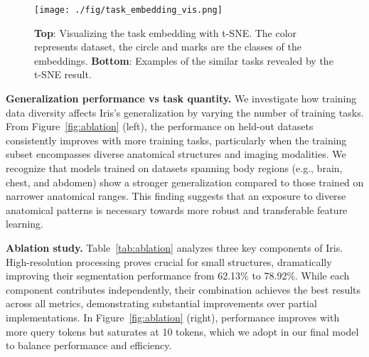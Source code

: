 \begin{figure}[t]
\begin{center}
\texttt{[image: ./fig/task\_embedding\_vis.png]}
\end{center}
\vspace{-1em}
\caption{\textbf{Top}: Visualizing the task embedding with t-SNE. The color represents dataset, the circle and marks are the classes of the embeddings. \textbf{Bottom}: Examples of the similar tasks revealed by the t-SNE result. }
\label{fig:task_embedding_vis}
\vspace{-1em}
\end{figure}


\noindent\textbf{Generalization performance vs task quantity.}
We investigate how training data diversity affects Iris's generalization by varying the number of training tasks. From Figure~\ref{fig:ablation} (left), the performance on held-out datasets consistently improves with more training tasks, particularly when the training subset encompasses diverse anatomical structures and imaging modalities. We recognize that models trained on datasets spanning body regions (e.g., brain, chest, and abdomen) show a stronger generalization compared to those trained on narrower anatomical ranges. This finding suggests that an exposure to diverse anatomical patterns is necessary towards more robust and transferable feature learning.



\noindent\textbf{Ablation study.}
Table~\ref{tab:ablation} analyzes three key components of Iris. High-resolution processing proves crucial for small structures, dramatically improving their segmentation performance from 62.13\% to 78.92\%. While each component contributes independently, their combination achieves the best results across all metrics, demonstrating substantial improvements over partial implementations. In Figure~\ref{fig:ablation} (right), performance improves with more query tokens but saturates at 10 tokens, which we adopt in our final model to balance performance and efficiency.

